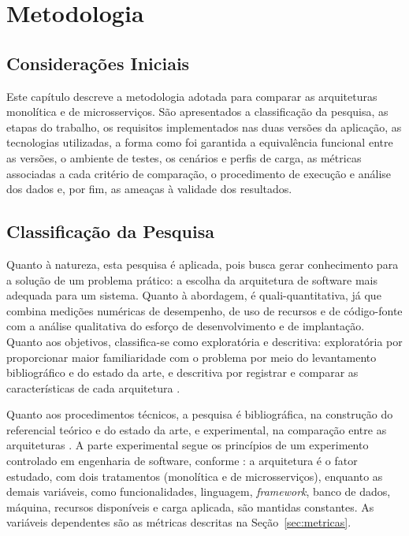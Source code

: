 \chapter{Metodologia}
\label{cap:metodologia}

\section{Considerações Iniciais}

Este capítulo descreve a metodologia adotada para comparar as arquiteturas monolítica e de
microsserviços. São apresentados a classificação da pesquisa, as etapas do trabalho, os
requisitos implementados nas duas versões da aplicação, as tecnologias utilizadas, a forma como
foi garantida a equivalência funcional entre as versões, o ambiente de testes, os cenários e
perfis de carga, as métricas associadas a cada critério de comparação, o procedimento de
execução e análise dos dados e, por fim, as ameaças à validade dos resultados.

\section{Classificação da Pesquisa}

Quanto à natureza, esta pesquisa é aplicada, pois busca gerar conhecimento para a solução de um
problema prático: a escolha da arquitetura de software mais adequada para um sistema. Quanto à
abordagem, é quali-quantitativa, já que combina medições numéricas de desempenho, de uso de
recursos e de código-fonte com a análise qualitativa do esforço de desenvolvimento e de
implantação. Quanto aos objetivos, classifica-se como exploratória e descritiva: exploratória
por proporcionar maior familiaridade com o problema por meio do levantamento bibliográfico e do
estado da arte, e descritiva por registrar e comparar as características de cada arquitetura
\cite{gil2017}.

Quanto aos procedimentos técnicos, a pesquisa é bibliográfica, na construção do referencial
teórico e do estado da arte, e experimental, na comparação entre as arquiteturas
\cite{gil2017}. A parte experimental segue os princípios de um experimento controlado em
engenharia de software, conforme : a arquitetura é o fator estudado, com
dois tratamentos (monolítica e de microsserviços), enquanto as demais variáveis, como
funcionalidades, linguagem, \textit{framework}, banco de dados, máquina, recursos disponíveis e
carga aplicada, são mantidas constantes. As variáveis dependentes são as métricas descritas na
Seção~\ref{sec:metricas}.

